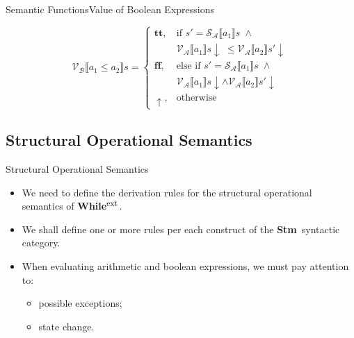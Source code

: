 \documentclass{beamer}
\newcommand{\ExtWhile}{\textbf{While}\ensuremath{^{\mbox{\footnotesize ext}}}}
\newcommand{\Stm}{\textbf{Stm}}
\newcommand{\sem}[2]{\mathcal{#1} \llbracket #2 \rrbracket}
\newcommand{\tr}{\mathbf{tt}}
\newcommand{\ff}{\mathbf{ff}}
\newcommand{\undefined}{\uparrow}
\newcommand{\defined}{\!\downarrow}
\begin{document}
\begin{frame}{Semantic Functions}{Value of Boolean Expressions}
\begin{overprint}
        \begin{equation*}
            \sem{V_B}{a_1 \leq a_2}s =
            \begin{cases}
                \tr,
                 & \mbox{if } s' = \sem{S_A}{a_1}s \;\wedge                  \\
                 & \sem{V_A}{a_1}s \defined \;\leq \sem{V_A}{a_2}s' \defined \\
                \ff,
                 & \mbox{else if } s' = \sem{S_A}{a_1}s \;\wedge             \\
                 & \sem{V_A}{a_1}s \defined \wedge \sem{V_A}{a_2}s' \defined \\
                \undefined,
                 & \mbox{otherwise}
            \end{cases}
        \end{equation*}
    \end{overprint}

\end{frame}

\subsection{Structural Operational Semantics}
\begin{frame}{Structural Operational Semantics}

    \begin{itemize}
        \item We need to define the derivation rules for the structural operational semantics of \ExtWhile.
        \item We shall define one or more rules per each construct of the \Stm\ syntactic category.
        \item When evaluating arithmetic and boolean expressions, we must pay attention to:
              \begin{itemize}
                  \item possible exceptions;
                  \item state change.
              \end{itemize}
    \end{itemize}

\end{frame}
\end{document}
